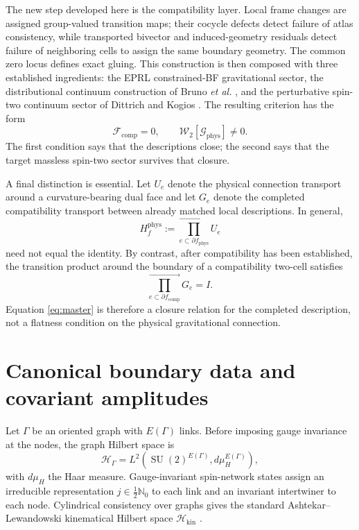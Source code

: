 \documentclass[aps,prd,reprint,nofootinbib,superscriptaddress]{revtex4-2}
\newcommand{\Hkin}{\mathcal H_{\mathrm{kin}}}
\newcommand{\SU}{\operatorname{SU}}
\newcommand{\phys}{\mathrm{phys}}
\begin{document}
The new step developed here is the compatibility layer. Local frame changes are assigned group-valued transition maps; their cocycle defects detect failure of atlas consistency, while transported bivector and induced-geometry residuals detect failure of neighboring cells to assign the same boundary geometry. The common zero locus defines exact gluing. This construction is then composed with three established ingredients: the EPRL constrained-BF gravitational sector, the distributional continuum construction of Bruno \emph{et al.} \cite{BrunoEtAl2026}, and the perturbative spin-two continuum sector of Dittrich and Kogios \cite{DittrichKogios2023}. The resulting criterion has the form
\begin{equation}
\boxed{
\mathcal F_{\mathrm{comp}}=0,
\qquad
\mathcal W_2[\mathcal G_{\phys}]\neq0.
}
\label{eq:maincriterion}
\end{equation}
The first condition says that the descriptions close; the second says that the target massless spin-two sector survives that closure.

A final distinction is essential. Let $U_e$ denote the physical connection transport around a curvature-bearing dual face and let $G_e$ denote the completed compatibility transport between already matched local descriptions. In general,
\begin{equation}
H_f^{\phys}:=\overrightarrow{\prod_{e\subset\partial f_{\phys}}}U_e
\label{eq:physicalhol}
\end{equation}
need not equal the identity. By contrast, after compatibility has been established, the transition product around the boundary of a compatibility two-cell satisfies
\begin{equation}
\boxed{
\overrightarrow{\prod_{e\subset\partial f_{\mathrm{comp}}}}G_e=I.
}
\label{eq:master}
\end{equation}
Equation \eqref{eq:master} is therefore a closure relation for the completed description, not a flatness condition on the physical gravitational connection.

\section{Canonical boundary data and covariant amplitudes}

Let $\Gamma$ be an oriented graph with $E(\Gamma)$ links. Before imposing gauge invariance at the nodes, the graph Hilbert space is
\begin{equation}
\mathcal H_{\Gamma}
=
L^2\!\left(\SU(2)^{E(\Gamma)},d\mu_H^{E(\Gamma)}\right),
\label{eq:Hgamma}
\end{equation}
with $d\mu_H$ the Haar measure. Gauge-invariant spin-network states assign an irreducible representation $j\in\frac12\mathbb N_0$ to each link and an invariant intertwiner to each node. Cylindrical consistency over graphs gives the standard Ashtekar--Lewandowski kinematical Hilbert space $\Hkin$ \cite{AshtekarLewandowski2004}.
\end{document}
